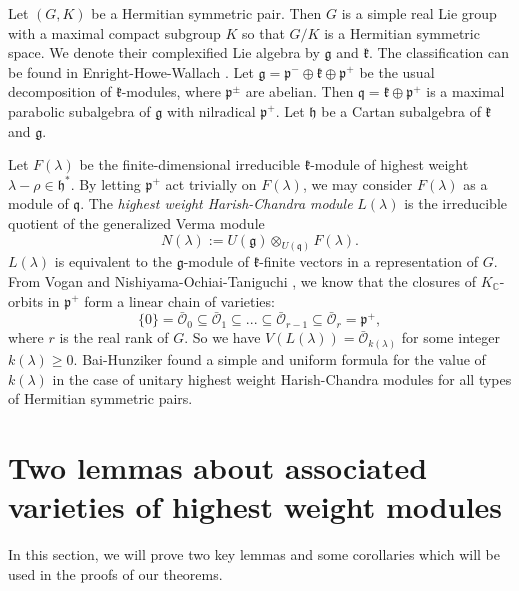 \documentclass{amsart}[12pt]
\renewcommand{\subset}{\subseteq}
\numberwithin{equation}{section}
\begin{document}
Let $(G,K)$ be a Hermitian symmetric pair. Then $G$ is a simple real Lie group with a maximal compact subgroup $K$ so that $G/K$ is a Hermitian symmetric space. We denote their complexified Lie algebra by $\mathfrak{g}$ and $\mathfrak{k}$. The classification can be found in Enright-Howe-Wallach \cite{EHW}.  Let $\mathfrak{g} =\mathfrak{p}^-\oplus\mathfrak{k}\oplus\mathfrak{p}^+$ be the usual decomposition of $\mathfrak{k}$-modules, where $\mathfrak{p}^\pm$ are abelian. Then $\mathfrak{q}=\mathfrak{k}\oplus\mathfrak{p}^+$ is a maximal parabolic subalgebra of $\mathfrak{g}$ with nilradical $\mathfrak{p}^+$. Let $\mathfrak{h}$ be a Cartan subalgebra of $\mathfrak{k}$ and $\mathfrak{g}$.

Let $F(\lambda)$ be the finite-dimensional irreducible $\mathfrak{k}$-module of highest weight $\lambda-\rho \in \mathfrak{h}^*$. By letting $\mathfrak{p}^+$ act trivially on $F(\lambda)$, we may consider $F(\lambda)$ as a module of $\mathfrak{q}$. The \textit{highest weight Harish-Chandra module} $L(\lambda)$ is the irreducible quotient of the  generalized Verma module
\[
N(\lambda):=U(\mathfrak{g})\otimes_{U(\mathfrak{q})}F(\lambda).
\]
$L(\lambda)$ is equivalent to the $\mathfrak{g}$-module of $\mathfrak{k}$-finite vectors in a representation of $G$.  From Vogan \cite{Vo91} and Nishiyama-Ochiai-Taniguchi \cite{NOT}, we know that the closures of $K_\mathbb{C}$-orbits in $ \mathfrak{p}^+ $ form a linear chain of varieties:
\begin{equation}\label{eq:chain}
\{0\}={\bar{\mathcal{O}}}_0\subset \bar{\mathcal{O}}_1\subset ...\subset\bar{\mathcal{O}}_{r-1}\subset \bar{\mathcal{O}}_r=\mathfrak{p}^+,
\end{equation}
where $r$ is the real rank of $G$. So we have
$V(L(\lambda))=\bar{\mathcal{O}}_{k(\lambda)}$ for some integer $k(\lambda)\geq 0$.
Bai-Hunziker \cite{BH} found a simple and uniform formula for the value of $k(\lambda)$ in the case of unitary highest weight Harish-Chandra modules for all types of Hermitian symmetric pairs.


















\section{Two lemmas about associated varieties of highest weight modules}
In this section, we will prove two key lemmas and some corollaries which will be used in the proofs of our theorems.
\end{document}

